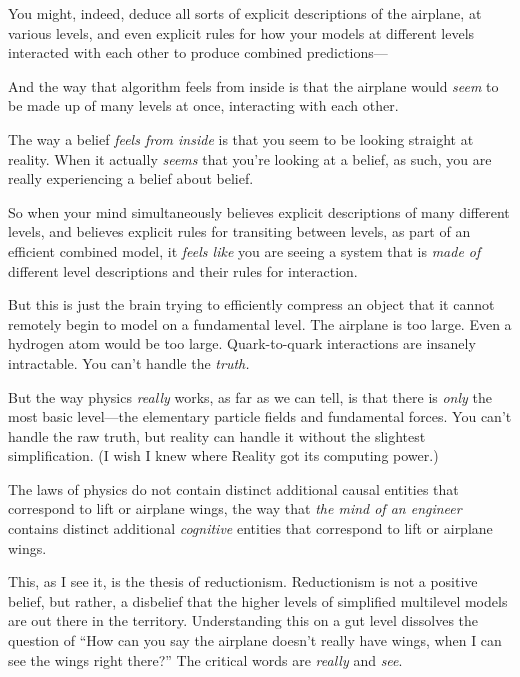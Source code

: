 {
 You might, indeed, deduce all sorts of explicit descriptions of
the airplane, at various levels, and even explicit rules for how your
models at different levels interacted with each other to produce
combined predictions---}

{
 And the way that algorithm feels from inside is that the airplane
would \textit{seem} to be made up of many levels at once, interacting
with each other.}

{
 The way a belief \textit{feels from inside} is that you seem to be
looking straight at reality. When it actually \textit{seems} that
you're looking at a belief, as such, you are really
experiencing a belief about belief.}

{
 So when your mind simultaneously believes explicit descriptions of
many different levels, and believes explicit rules for transiting
between levels, as part of an efficient combined model, it
\textit{feels like} you are seeing a system that is \textit{made of}
different level descriptions and their rules for interaction.}

{
 But this is just the brain trying to efficiently compress an
object that it cannot remotely begin to model on a fundamental level.
The airplane is too large. Even a hydrogen atom would be too large.
Quark-to-quark interactions are insanely intractable. You
can't handle the \textit{truth.}}

{
 But the way physics \textit{really} works, as far as we can tell,
is that there is \textit{only} the most basic level---the elementary
particle fields and fundamental forces. You can't
handle the raw truth, but reality can handle it without the slightest
simplification. (I wish I knew where Reality got its computing power.)}

{
 The laws of physics do not contain distinct additional causal
entities that correspond to lift or airplane wings, the way that
\textit{the mind of an engineer} contains distinct additional
\textit{cognitive} entities that correspond to lift or airplane wings.}

{
 This, as I see it, is the thesis of reductionism. Reductionism is
not a positive belief, but rather, a disbelief that the higher levels
of simplified multilevel models are out there in the territory.
Understanding this on a gut level dissolves the question of
``How can you say the airplane doesn't
really have wings, when I can see the wings right
there?'' The critical words are \textit{really} and
\textit{see}.}

\myendsectiontext

